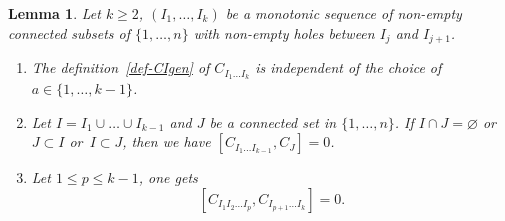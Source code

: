 \documentclass[10pt,a4paper]{amsart}
\numberwithin{equation}{section}
\newtheorem{lemm}[theo]{Lemma}
\theoremstyle{definition}
\begin{document}
\begin{lemm}\label{lem:Commg}
 Let $k\geq 2$, $(I_1,\dots, I_k)$ be a monotonic sequence of non-empty connected subsets of $\{1,\dots,n\}$ with non-empty holes between $I_{j}$ and $I_{j+1}$.
\begin{enumerate}\itemsep=0pt
\item[$1.$] The definition~\eqref{def-CIgen} of $C_{I_1\dots I_k}$ is independent of the choice of $a\in\{1,\dots,k-1\}$.
\item[$2.$] Let $I=I_1 \cup \dots \cup I_{k-1}$ and $J$ be a connected set in $\{1,\dots,n\}$.
If $I\cap J=\varnothing$ or $J\subset I$ or~$I\subset J$, then we have $[C_{I_1\dots I_{k-1} },C_J]=0$.
\item[$3.$]
Let $1\leq p \leq k-1$, one gets
\begin{equation}\label{eq:com4}
 [C_{I_1I_2\dots I_p} , C_{I_{p+1}\dots I_{k}}]=0 .
\end{equation}
\end{enumerate}
\end{lemm}
\end{document}
